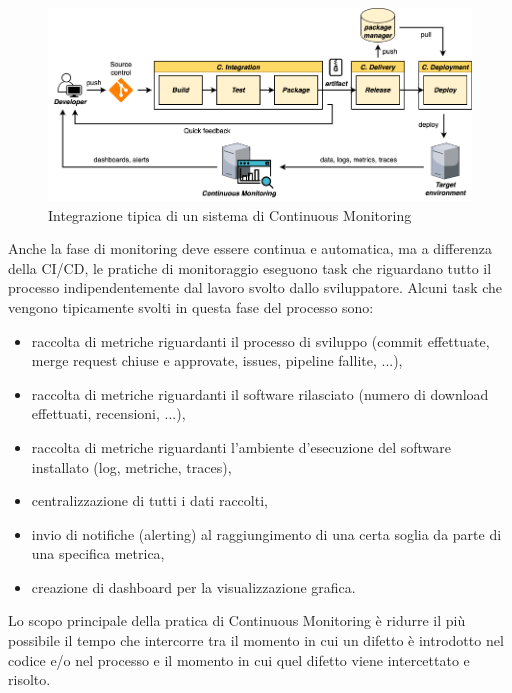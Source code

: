 \begin{figure}[H]
    \centering
    \includegraphics[width=1\textwidth]{img/ci-monitoring.png}
    \caption{Integrazione tipica di un sistema di Continuous Monitoring}
    \label{ci-monitoring}
\end{figure}

Anche la fase di monitoring deve essere continua e automatica,
ma a differenza della CI/CD, 
le pratiche di monitoraggio eseguono task che riguardano tutto il processo indipendentemente dal lavoro svolto dallo sviluppatore.
Alcuni task che vengono tipicamente svolti in questa fase del processo sono:

\begin{itemize}
    \item raccolta di metriche riguardanti il processo di sviluppo (commit effettuate, merge request chiuse e approvate, issues, pipeline fallite, ...),
    
    \item raccolta di metriche riguardanti il software rilasciato (numero di download effettuati, recensioni, ...),
    
    \item raccolta di metriche riguardanti l'ambiente d'esecuzione del software installato (log, metriche, traces),
    
    \item centralizzazione di tutti i dati raccolti,
    
    \item invio di notifiche (alerting) al raggiungimento di una certa soglia da parte di una specifica metrica,
    
    \item creazione di dashboard per la visualizzazione grafica.
\end{itemize}

Lo scopo principale della pratica di Continuous Monitoring è ridurre il più possibile il tempo che intercorre tra il momento in cui un difetto è introdotto nel codice e/o nel processo e il momento in cui quel difetto viene intercettato e risolto.

